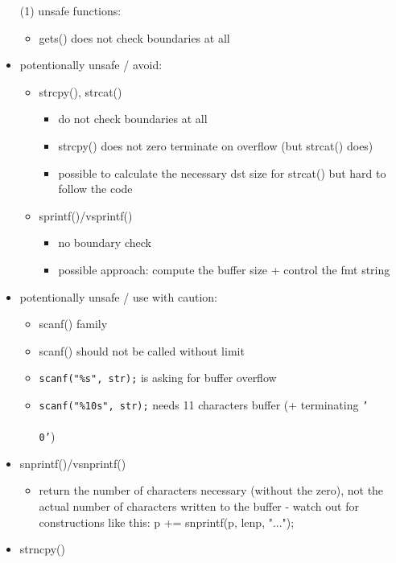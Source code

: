 \begin{itemize}
\item[(1)] unsafe functions:
  \begin{itemize}
  \item gets() does not check boundaries at all
  \end{itemize}
\item potentionally unsafe / avoid:
  \begin{itemize}
  \item strcpy(), strcat()
    \begin{itemize}
    \item do not check boundaries at all
    \item strcpy() does not zero terminate on overflow (but strcat() does)
    \item possible to calculate the necessary dst size for strcat()
      but hard to follow the code
    \end{itemize}
  \item sprintf()/vsprintf()
    \begin{itemize}
    \item no boundary check
    \item possible approach: compute the buffer size + control the fmt string
    \end{itemize}
  \end{itemize}
\item potentionally unsafe / use with caution:
  \begin{itemize}
  \item scanf() family
    \item scanf() should not be called without limit
      \item \texttt{scanf("\%s", str);} is asking for buffer overflow
      \item \texttt{scanf("\%10s", str);} needs 11 characters buffer
         (+ terminating \texttt{'\\\\0'})
  \end{itemize}
  \item snprintf()/vsnprintf()
  \begin{itemize}
    \item return the number of characters necessary (without the zero), not the
      actual number of characters written to the buffer
      - watch out for constructions like this:
        p += snprintf(p, lenp, "...");
  \end{itemize}
  \item strncpy()

\end{itemize}
